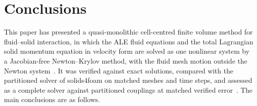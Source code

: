 \section{Conclusions}\label{sec:conclusion}


This paper has presented a quasi-monolithic cell-centred finite volume method for fluid--solid interaction, in which the ALE fluid equations and the total Lagrangian solid momentum equation in velocity form are solved as one nonlinear system by a Jacobian-free Newton--Krylov method, with the fluid mesh motion outside the Newton system~\citep{Liu2014, JaimanJoshi2022}.
It was verified against exact solutions, compared with the partitioned solver of solids4foam on matched meshes and time steps, and assessed as a complete solver against partitioned couplings at matched verified error~\citep{CardiffFSIVerification2026}.
The main conclusions are as follows.


